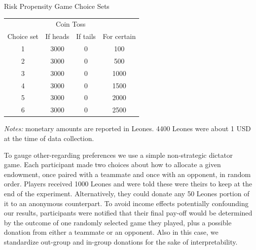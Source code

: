 \begin{threeparttable}[htbp]
  \centering
  \caption{Risk Propensity Game Choice Sets}
    \begin{tabular}{cccc}
    \toprule
          & \multicolumn{2}{c}{Coin Toss} &  \\
    Choice set & If heads & If tails & For certain \\
    \midrule
    1    & 3000  & 0     & 100 \\
    2    & 3000  & 0     & 500 \\
    3    & 3000  & 0     & 1000 \\
    4    & 3000  & 0     & 1500 \\
    5    & 3000  & 0     & 2000 \\
    6    & 3000  & 0     & 2500 \\
    \bottomrule
    \end{tabular}%
    \begin{tablenotes}
    	\item \textit{Notes: } monetary amounts are reported in Leones. 4400 Leones were about 1 USD at the time of data collection.
    	\item
    \end{tablenotes}
  \label{tab:sl:riskchoice}%
\end{threeparttable}%

To gauge other-regarding preferences we use a simple non-strategic dictator game. Each participant made two choices about how to allocate a given endowment, once paired with a teammate and once with an opponent, in random order. Players received 1000 Leones and were told these were theirs to keep at the end of the experiment. Alternatively, they could donate any 50 Leones portion of it to an anonymous counterpart. To avoid income effects potentially confounding our results, participants were notified that their final pay-off would be determined by the outcome of one randomly selected game they played, plus a possible donation from either a teammate or an opponent. Also in this case, we standardize out-group and in-group donations for the sake of interpretability.

